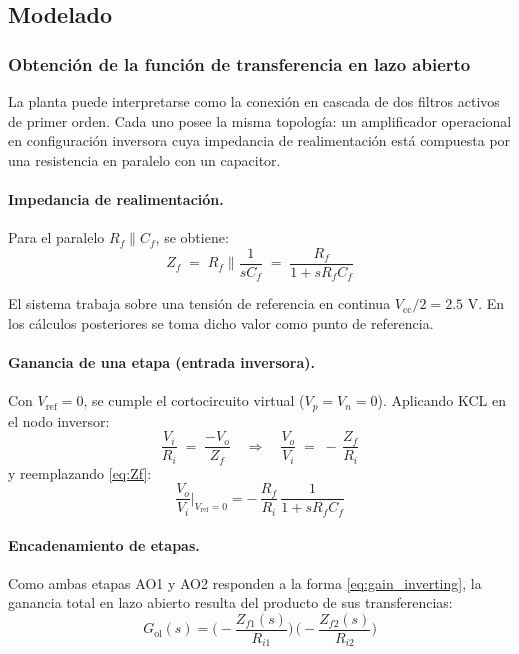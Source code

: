 \subsection{Modelado}
\subsubsection{Obtención de la función de transferencia en lazo abierto}

La planta puede interpretarse como la conexión en cascada de dos filtros activos de primer orden. Cada uno posee la misma topología: un amplificador operacional en configuración inversora cuya impedancia de realimentación está compuesta por una resistencia en paralelo con un capacitor.

\paragraph{Impedancia de realimentación.}  
Para el paralelo $R_f \parallel C_f$, se obtiene:
\begin{equation}
	Z_f \;=\; R_f \parallel \frac{1}{sC_f}
	\;=\; \frac{R_f}{1 + s R_f C_f}
	\label{eq:Zf}
\end{equation}



El sistema trabaja sobre una tensión de referencia en continua $V_{\text{cc}}/2 = 2.5$ V. En los cálculos posteriores se toma dicho valor como punto de referencia.

\paragraph{Ganancia de una etapa (entrada inversora).}  
Con $V_{\text{ref}}=0$, se cumple el cortocircuito virtual ($V_p = V_n = 0$). Aplicando KCL en el nodo inversor:
\[
\frac{V_i}{R_i} \;=\; \frac{-V_o}{Z_f}
\quad\Rightarrow\quad
\frac{V_o}{V_i} \;=\; -\,\frac{Z_f}{R_i}
\]
y reemplazando \eqref{eq:Zf}:
\begin{equation}
	\frac{V_o}{V_i}\Bigg|_{V_{\text{ref}}=0}
	= -\,\frac{R_f}{R_i}\,\frac{1}{1+sR_f C_f}
	\label{eq:gain_inverting}
\end{equation}

\paragraph{Encadenamiento de etapas.}  
Como ambas etapas AO1 y AO2 responden a la forma \eqref{eq:gain_inverting}, la ganancia total en lazo abierto resulta del producto de sus transferencias:
\[
G_{\text{ol}}(s)
= \Big(-\frac{Z_{f1}(s)}{R_{i1}}\Big)\,
\Big(-\frac{Z_{f2}(s)}{R_{i2}}\Big)
\]

